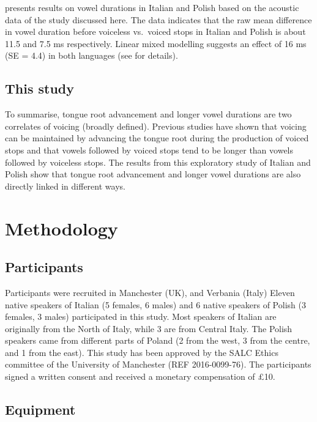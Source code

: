 \documentclass[12pt,]{article}
\begin{document}
\citet{coretta2018j} presents results on vowel durations in Italian and
Polish based on the acoustic data of the study discussed here. The data
indicates that the raw mean difference in vowel duration before
voiceless vs.~voiced stops in Italian and Polish is about 11.5 and 7.5
ms respectively. Linear mixed modelling suggests an effect of 16 ms (SE
= 4.4) in both languages (see \citealt{coretta2018j} for details).

\subsection{This study}\label{this-study}

To summarise, tongue root advancement and longer vowel durations are two
correlates of voicing (broadly defined). Previous studies have shown
that voicing can be maintained by advancing the tongue root during the
production of voiced stops and that vowels followed by voiced stops tend
to be longer than vowels followed by voiceless stops. The results from
this exploratory study of Italian and Polish show that tongue root
advancement and longer vowel durations are also directly linked in
different ways.

\section{Methodology}\label{methodology}

\subsection{Participants}\label{participants}

Participants were recruited in Manchester (UK), and Verbania (Italy)
Eleven native speakers of Italian (5 females, 6 males) and 6 native
speakers of Polish (3 females, 3 males) participated in this study. Most
speakers of Italian are originally from the North of Italy, while 3 are
from Central Italy. The Polish speakers came from different parts of
Poland (2 from the west, 3 from the centre, and 1 from the east). This
study has been approved by the SALC Ethics committee of the University
of Manchester (REF 2016-0099-76). The participants signed a written
consent and received a monetary compensation of £10.

\subsection{Equipment}\label{equipment}
\end{document}
